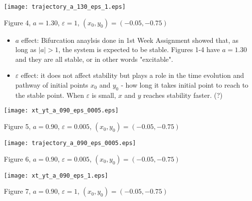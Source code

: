 \documentclass{article}
\begin{document}
\begin{center}
\texttt{[image: trajectory\_a\_130\_eps\_1.eps]}
\begin{footnotesize}
 Figure 4, $a=1.30$, $\varepsilon=1$, $(x_0,y_0)=(-0.05,-0.75)$
\end{footnotesize}
\end{center}

\begin{itemize}

 \item $a$ effect: Bifurcation anaylsis done in 1st Week Assignment showed that, as long as $|a|>1$, the system is expected to be stable. Figures 1-4 have $a=1.30$ and they are all stable, or in other words "excitable".

 \item $\varepsilon$ effect: it does not affect stability but plays a role in the time evolution and pathway of initial points $x_0$ and $y_0$ - how long it takes initial point to reach to the stable point. When $\varepsilon$ is small, $x$ and $y$ reaches stability faster. (?)
\end{itemize}

\begin{center}
\texttt{[image: xt\_yt\_a\_090\_eps\_0005.eps]}
\begin{footnotesize}
 Figure 5, $a=0.90$, $\varepsilon=0.005$, $(x_0,y_0)=(-0.05,-0.75)$
\end{footnotesize}
\end{center}

\begin{center}
\texttt{[image: trajectory\_a\_090\_eps\_0005.eps]}
\begin{footnotesize}
 Figure 6, $a=0.90$, $\varepsilon=0.005$, $(x_0,y_0)=(-0.05,-0.75)$
\end{footnotesize}
\end{center}

\begin{center}
\texttt{[image: xt\_yt\_a\_090\_eps\_1.eps]}
\begin{footnotesize}
 Figure 7, $a=0.90$, $\varepsilon=1$, $(x_0,y_0)=(-0.05,-0.75)$
\end{footnotesize}
\end{center}
\end{document}
